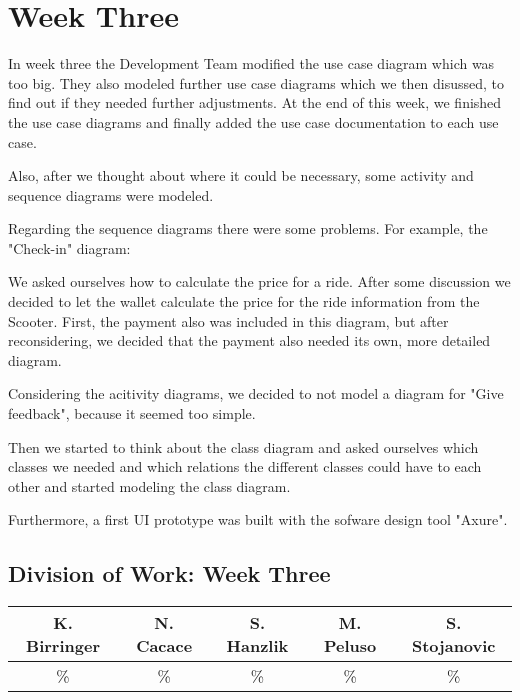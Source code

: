 \documentclass[a4paper, 12pt]{article}
\begin{document}
\section{Week Three}
In week three the Development Team modified the use case diagram which was too big. They also modeled further use case diagrams which we then disussed, to find out if they needed further adjustments. At the end of this week, we finished the use case diagrams and finally added the use case documentation to each use case.

Also, after we thought about where it could be necessary, some activity and sequence diagrams were modeled.

Regarding the sequence diagrams there were some problems.
For example, the "Check-in" diagram:

We asked ourselves how to calculate the price for a ride. After some discussion we decided to let the wallet calculate the price for the ride information from the Scooter.
First, the payment also was included in this diagram, but after reconsidering, we decided that the payment also needed its own, more detailed diagram.

Considering the acitivity diagrams, we decided to not model a diagram for "Give feedback", because it seemed too simple.

Then we started to think about the class diagram and asked ourselves which classes we needed and which relations the different classes could have to each other and started modeling the class diagram.

Furthermore, a first UI prototype was built with the sofware design tool "Axure".\cite{axure}





\newpage
\subsection{Division of Work: Week Three}

\begin{table}[h]
\centering
\setlength{\tabcolsep}{10pt}
\begin{tabular}{|c|c|c|c|c|}
\hline
K. Birringer & N. Cacace & S. Hanzlik & M. Peluso & S. Stojanovic\\
\hline
\% & \% & \% & \% & \% \\ 
\hline
\end{tabular}
\end{table}
\end{document}
